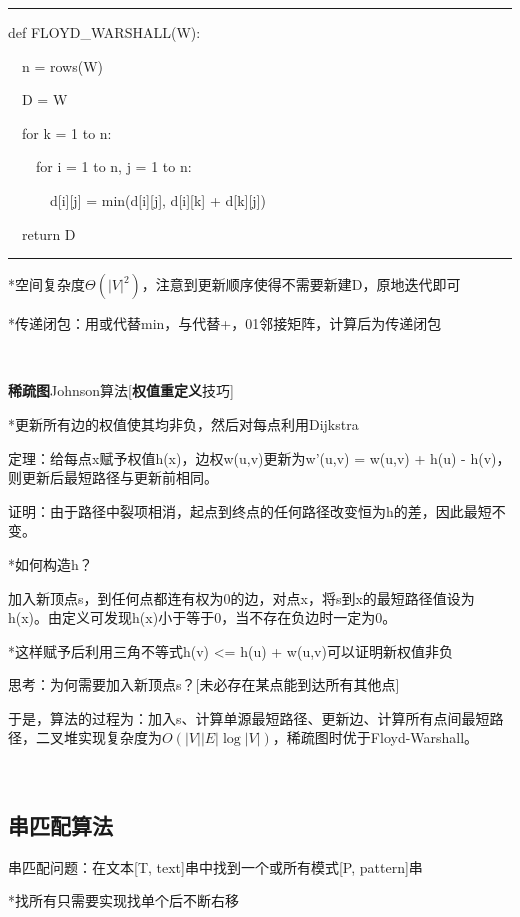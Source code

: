 \documentclass[a4paper,UTF8,fontset=windows]{ctexart}
\newenvironment{code}{\rule{36em}{0.1em}\setlength{\parindent}{1em}

}{

\setlength{\parindent}{0em}\rule{36em}{0.1em}}
\begin{document}
\begin{code}
def FLOYD\_WARSHALL(W):

\ \ n = rows(W)

\ \ D = W

\ \ for k = 1 to n:

\ \ \ \ for i = 1 to n, j = 1 to n:

\ \ \ \ \ \ d[i][j] = min(d[i][j], d[i][k] + d[k][j])

\ \ return D
\end{code}

*\hspace{0em}空间复杂度$\Theta(|V|^2)$，注意到更新顺序使得不需要新建D，原地迭代即可

*\hspace{0em}传递闭包：用或代替min，与代替+，01邻接矩阵，计算后为传递闭包

\

\textbf{稀疏图}Johnson算法[\textbf{权值重定义}技巧]

*\hspace{0em}更新所有边的权值使其均非负，然后对每点利用Dijkstra

定理：给每点x赋予权值h(x)，边权w(u,v)更新为w'(u,v) = w(u,v) + h(u) - h(v)，则更新后最短路径与更新前相同。

证明：由于路径中裂项相消，起点到终点的任何路径改变恒为h的差，因此最短不变。

*\hspace{0em}如何构造h？

加入新顶点s，到任何点都连有权为0的边，对点x，将s到x的最短路径值设为h(x)。由定义可发现h(x)小于等于0，当不存在负边时一定为0。

*\hspace{0em}这样赋予后利用三角不等式h(v) <= h(u) + w(u,v)可以证明新权值非负

思考：为何需要加入新顶点s？[未必存在某点能到达所有其他点]

于是，算法的过程为：加入s、计算单源最短路径、更新边、计算所有点间最短路径，二叉堆实现复杂度为$O(|V||E|\log|V|)$，稀疏图时优于Floyd-Warshall。

\

\subsection{串匹配算法}

串匹配问题：在文本[T, text]串中找到一个或所有模式[P, pattern]串

*\hspace{0em}找所有只需要实现找单个后不断右移
\end{document}
